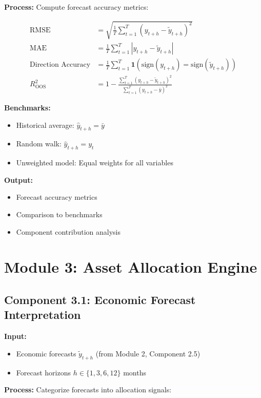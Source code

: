 \documentclass[11pt,a4paper]{article}
\begin{document}
\textbf{Process:}
Compute forecast accuracy metrics:

\begin{align}
    \text{RMSE} &= \sqrt{\frac{1}{T} \sum_{t=1}^{T} (y_{t+h} - \tilde{y}_{t+h})^2} \\
    \text{MAE} &= \frac{1}{T} \sum_{t=1}^{T} |y_{t+h} - \tilde{y}_{t+h}| \\
    \text{Direction Accuracy} &= \frac{1}{T} \sum_{t=1}^{T} \mathbf{1}(\text{sign}(y_{t+h}) = \text{sign}(\tilde{y}_{t+h})) \\
    R^2_{\text{OOS}} &= 1 - \frac{\sum_{t=1}^{T} (y_{t+h} - \tilde{y}_{t+h})^2}{\sum_{t=1}^{T} (y_{t+h} - \bar{y})^2}
\end{align}

\textbf{Benchmarks:}
\begin{itemize}
    \item Historical average: $\hat{y}_{t+h} = \bar{y}$
    \item Random walk: $\hat{y}_{t+h} = y_t$
    \item Unweighted model: Equal weights for all variables
\end{itemize}

\textbf{Output:}
\begin{itemize}
    \item Forecast accuracy metrics
    \item Comparison to benchmarks
    \item Component contribution analysis
\end{itemize}

\section{Module 3: Asset Allocation Engine}

\subsection{Component 3.1: Economic Forecast Interpretation}

\textbf{Input:}
\begin{itemize}
    \item Economic forecasts $\tilde{y}_{t+h}$ (from Module 2, Component 2.5)
    \item Forecast horizons $h \in \{1, 3, 6, 12\}$ months
\end{itemize}

\textbf{Process:}
Categorize forecasts into allocation signals:
\end{document}
